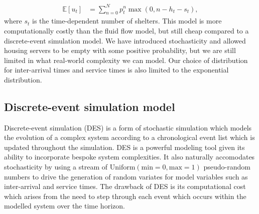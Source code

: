 \documentclass[12pt,a4paper]{article}
\begin{document}
%
\begin{align} \label{u_t_mmt}
\mathbb{E}[u_t] & = \sum_{n=0}^{N} p^n_t \max(0,n-h_t-s_t), 
\end{align}
%
where $s_t$ is the time-dependent number of shelters. This model is more computationally costly than the fluid flow model, but still cheap compared to a discrete-event simulation model. We have introduced stochasticity and allowed housing servers to be empty with some positive probability, but we are still limited in what real-world complexity we can model. Our choice of distribution for inter-arrival times and service times is also limited to the exponential distribution. 
%
\subsection{Discrete-event simulation model} \label{DES}
%
Discrete-event simulation (DES) is a form of stochastic simulation which models the evolution of a complex system according to a chronological event list which is updated throughout the simulation. DES is a powerful modeling tool given its ability to incorporate bespoke system complexities. It also naturally accomodates stochasticity by using a stream of $\text{Uniform}(\text{min} = 0, \text{max} = 1)$ pseudo-random numbers to drive the generation of random variates for model variables such as inter-arrival and service times. The drawback of DES is its computational cost which arises from the need to step through each event which occurs within the modelled system over the time horizon.
\end{document}
